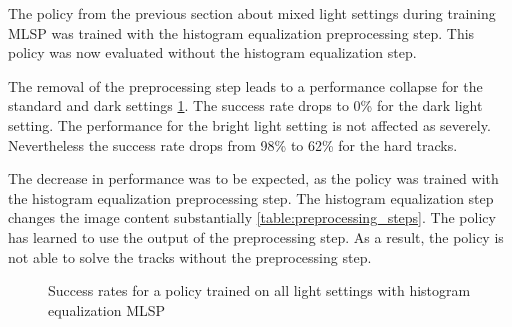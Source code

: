 The policy from the previous section about mixed light settings during training \ac{MLSP} was trained with the histogram equalization preprocessing step. This policy was now evaluated without the histogram equalization step. 

The removal of the preprocessing step leads to a performance collapse for the standard and dark settings \ref{fig:hardDistance_mixedLight_comparison_withWithoutHistogramEqualization}. The success rate drops to 0\% for the dark light setting.
The performance for the bright light setting is not affected as severely. Nevertheless the success rate drops from 98\% to 62\% for the hard tracks.

The decrease in performance was to be expected, as the policy was trained with the histogram equalization preprocessing step. The histogram equalization step changes the image content substantially \ref{table:preprocessing_steps}. The policy has learned to use the output of the preprocessing step. As a result, the policy is not able to solve the tracks without the preprocessing step.

\begin{figure}
    \centering
    \caption{Success rates for a policy trained on all light settings with histogram equalization \ac{MLSP}}
    \label{fig:hardDistance_mixedLight_comparison_withWithoutHistogramEqualization}
\end{figure}


